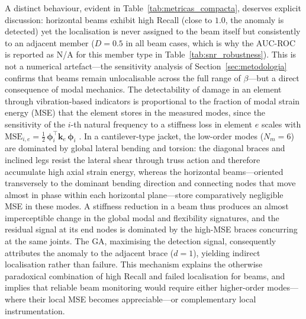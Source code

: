 \documentclass[preprint,12pt]{elsarticle}
\begin{document}
A distinct behaviour, evident in Table~\ref{tab:metricas_compacta}, deserves explicit
discussion: horizontal beams exhibit high Recall (close to $1.0$, the anomaly is detected)
yet the localisation is never assigned to the beam itself but consistently to an adjacent
member ($D=0.5$ in all beam cases, which is why the AUC-ROC is reported as N/A for this
member type in Table~\ref{tab:snr_robustness}). This is not a numerical artefact---the
sensitivity analysis of Section~\ref{sec:metodologia} confirms that beams remain
unlocalisable across the full range of $\beta$---but a direct consequence of modal
mechanics. The detectability of damage in an element through vibration-based indicators is
proportional to the fraction of modal strain energy (MSE) that the element stores in the
measured modes, since the sensitivity of the $i$-th natural frequency to a stiffness loss
in element $e$ scales with $\text{MSE}_{i,e}=\tfrac{1}{2}\,\boldsymbol{\phi}_i^{\!\top}\mathbf{k}_e\,\boldsymbol{\phi}_i$
\citep{doebling1996damage}. In a cantilever-type jacket, the low-order modes ($N_m=6$) are
dominated by global lateral bending and torsion: the diagonal braces and inclined legs
resist the lateral shear through truss action and therefore accumulate high axial strain
energy, whereas the horizontal beams---oriented transversely to the dominant bending
direction and connecting nodes that move almost in phase within each horizontal plane---store
comparatively negligible MSE in these modes. A stiffness reduction in a beam thus produces an
almost imperceptible change in the global modal and flexibility signatures, and the residual
signal at its end nodes is dominated by the high-MSE braces concurring at the same joints. The
GA, maximising the detection signal, consequently attributes the anomaly to the adjacent brace
($d=1$), yielding indirect localisation rather than failure. This mechanism explains the
otherwise paradoxical combination of high Recall and failed localisation for beams, and
implies that reliable beam monitoring would require either higher-order modes---where their
local MSE becomes appreciable---or complementary local instrumentation.
\end{document}
